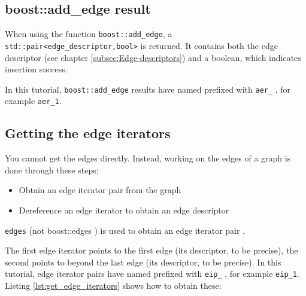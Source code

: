 \subsection{boost::add\_edge result}
\label{subsec:boost_add_edge_result}

When using the function \verb;boost::add_edge;, 
a \verb;std::pair<edge_descriptor,bool>; is returned.
It contains both the edge descriptor 
(see chapter \ref{subsec:Edge-descriptors}) 
and a boolean, which indicates insertion success.

In this tutorial, \verb;boost::add_edge; results 
have named prefixed with \verb;aer_; ,
for example \verb;aer_1;.

\subsection{Getting the edge iterators}
\label{subsec:get_edge_iterators}

You cannot get the edges directly.
Instead, working on the edges of a graph is done through these steps:

\begin{itemize}
  \item Obtain an edge iterator pair from the graph
  \item Dereference an edge iterator to obtain an edge descriptor
\end{itemize}

\verb;edges;  
(not boost::edges )
is used to obtain an edge iterator pair
.

The first edge iterator 
points to the first edge (its descriptor, to be precise), the second points
to beyond the last edge (its descriptor, to be precise).
In this tutorial, 
edge iterator pairs have named prefixed with \verb;eip_; , 
for example \verb;eip_1;.
Listing \ref{lst:get_edge_iterators}
shows how to obtain these:



